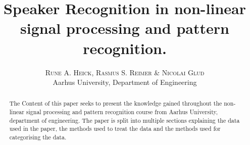 
\usepackage{amsmath,amsfonts,amssymb}

\title{\vspace{-15mm}\fontsize{24pt}{10pt}\selectfont\textbf{Speaker Recognition in non-linear signal processing and pattern recognition.}} %

\author{
\large
\textsc{Rune A. Heick, Rasmus S. Reimer \& Nicolai Glud}\\[2mm] %
\normalsize Aarhus University, Department of Engineering \\ %
\vspace{-5mm}
}
\date{}




\maketitle %
\thispagestyle{fancy} %
\raggedright


\begin{abstract}
The Content of this paper seeks to present the knowledge gained throughout the non-linear signal processing and pattern recognition course from Aarhus University, department of engineering. The paper is split into multiple sections explaining the data used in the paper, the methods used to treat the data and the methods used for categorising the data.
\end{abstract}







